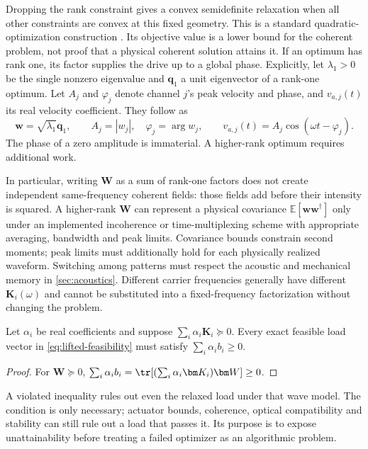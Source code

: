 Dropping the rank constraint gives a convex semidefinite relaxation when all
other constraints are convex at this fixed geometry. This is a standard
quadratic-optimization construction \cite{luo2010}. Its objective value is a
lower bound for the coherent problem, not proof that a physical coherent
solution attains it. If an optimum has rank one, its factor supplies the drive
up to a global phase. Explicitly, let $\lambda_1>0$ be the single nonzero
eigenvalue and $\bm q_1$ a unit eigenvector of a rank-one optimum. Let $A_j$
and $\varphi_j$ denote channel $j$'s peak velocity and phase, and $v_{a,j}(t)$
its real velocity coefficient. They follow as
\begin{equation}
 \bm w=\sqrt{\lambda_1}\bm q_1,\qquad
 A_j=|w_j|,\quad \varphi_j=\arg w_j,\qquad
 v_{a,j}(t)=A_j\cos(\omega t-\varphi_j).
 \label{eq:drive-recovery}
\end{equation}
The phase of a zero amplitude is immaterial. A higher-rank optimum requires
additional work.

In particular, writing $\bm W$ as a sum of rank-one factors does not create
independent same-frequency coherent fields: those fields add before their
intensity is squared. A higher-rank $\bm W$ can represent a physical covariance
$\mathbb E[\bm w\bm w^\dagger]$ only under an implemented incoherence or
time-multiplexing scheme with appropriate averaging, bandwidth and peak limits.
Covariance bounds constrain second moments; peak limits must additionally hold
for each physically realized waveform.
Switching among patterns must respect the acoustic and mechanical memory in
\cref{sec:acoustics}. Different carrier frequencies generally have different
$\bm K_i(\omega)$ and cannot be substituted into a fixed-frequency factorization
without changing the problem.

\begin{proposition}
Let $\alpha_i$ be real coefficients and suppose
$\sum_i\alpha_i\bm K_i\succeq0$. Every exact feasible load vector in
\cref{eq:lifted-feasibility} must satisfy $\sum_i\alpha_i b_i\geq0$.
\end{proposition}
\begin{proof}
For $\bm W\succeq0$,
$\sum_i\alpha_i b_i=\tr[(\sum_i\alpha_i\bm K_i)\bm W]\geq0$.
\end{proof}
A violated inequality rules out even the relaxed load under that wave model.
The condition is only necessary; actuator bounds, coherence, optical
compatibility and stability can still rule out a load that passes it. Its
purpose is to expose unattainability before treating a failed optimizer as an
algorithmic problem.

